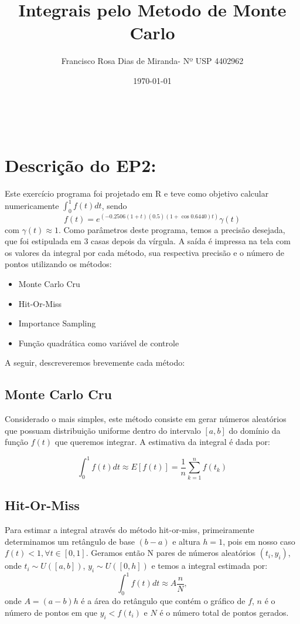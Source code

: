 \documentclass[a4paper]{article}
\title{Integrais pelo Metodo de Monte Carlo}
\author{Francisco Rosa Dias de Miranda- Nº USP 4402962}
\date{\today}
\begin{document}
\maketitle\

\section{Descrição do EP2:}

Este exercício programa foi projetado em R e teve como objetivo calcular numericamente $\int_{0}^{1}f(t)dt$, sendo \[f(t)=e^{(-0.2506(1+t) (0.5) (1+\cos0.6440) t)}\gamma(t)\] com $\gamma(t) \approx 1$.
Como parâmetros deste programa, temos a precisão desejada, que foi estipulada em 3 casas depois da vírgula. A saída é impressa na tela com os valores da integral por cada método, sua respectiva precisão e o número de pontos utilizando os métodos:
\begin{itemize}
\item Monte Carlo Cru
\item Hit-Or-Miss
\item Importance Sampling
\item Função quadrática como variável de controle
\end{itemize}
A seguir, descreveremos brevemente cada método:

\subsection{Monte Carlo Cru}
  Considerado o mais simples, este método consiste em gerar números aleatórios que possuam distribuição uniforme dentro do intervalo $[a,b]$ do domínio da função $f(t)$ que queremos integrar. A estimativa da integral é dada por:
  
\[\int_0^1 f(t)dt\approx E[f(t)]=\dfrac{1}{n}\sum_{k=1}^nf(t_k)\]

\subsection{Hit-Or-Miss} 

  Para estimar a integral através do método hit-or-miss, primeiramente determinamos um retângulo de base $(b-a)$ e altura $h = 1$, pois em nosso caso $f(t)<1, \forall t \in [0,1]$. Geramos então N pares de números aleatórios $(t_i,y_i)$, onde $t_i\sim U([a,b])$, $y_i\sim U([0,h])$ e temos a integral estimada por:
\[ \int_0^1f(t)dt\approx A\dfrac{n}{N},\]
onde $A=(a-b)h$ é a área do retângulo que contém o gráfico de $f$, $n$ é o número de pontos em que $y_i<f(t_i)$ e $N$ é o número total de pontos gerados.
\end{document}

